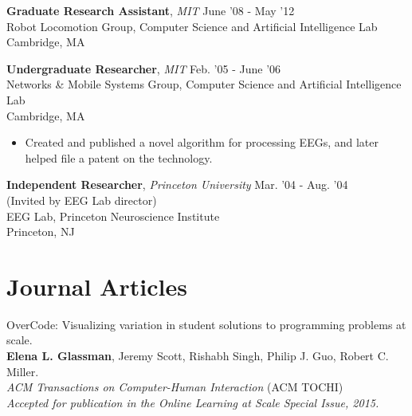 \documentclass[margin]{res}
\begin{document}
\begin{resume}
 {\bf Graduate Research Assistant}, {\it MIT} \hfill June '08 - May '12 \\ Robot Locomotion Group, Computer Science and Artificial Intelligence Lab \\ Cambridge, MA 
 
% 
  {\bf Undergraduate Researcher}, {\it MIT} \hfill Feb. '05 - June '06 \\ Networks \& Mobile Systems Group, Computer Science and Artificial Intelligence Lab \\ Cambridge, MA 
 \begin{itemize} \itemsep -2pt  %
\item Created and published a novel algorithm for processing EEGs, and later helped file a patent on the technology.
\end{itemize}


  {\bf Independent Researcher}, {\it Princeton University} \hfill Mar. '04 - Aug. '04 \\ (Invited by EEG Lab director)\\ EEG Lab, Princeton Neuroscience Institute \\ Princeton, NJ 
 
 
\section{Journal Articles}

OverCode: Visualizing variation in student solutions to programming problems at scale.\\
{\bf Elena L. Glassman}, Jeremy Scott, Rishabh Singh, Philip J. Guo, Robert C. Miller. \\ 
{\it ACM Transactions on Computer-Human Interaction} (ACM TOCHI)\\
{\it Accepted for publication in the Online Learning at Scale Special Issue, 2015.}


\end{resume}
\end{document}
